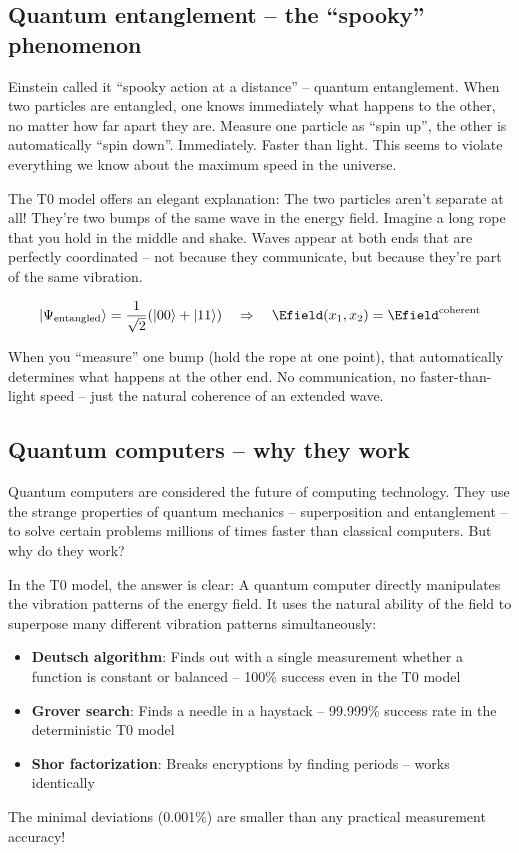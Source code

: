 	\subsection{Quantum entanglement -- the ``spooky'' phenomenon}
	
	Einstein called it ``spooky action at a distance'' -- quantum entanglement. When two particles are entangled, one knows immediately what happens to the other, no matter how far apart they are. Measure one particle as ``spin up'', the other is automatically ``spin down''. Immediately. Faster than light. This seems to violate everything we know about the maximum speed in the universe.
	
	The T0 model offers an elegant explanation: The two particles aren't separate at all! They're two bumps of the same wave in the energy field. Imagine a long rope that you hold in the middle and shake. Waves appear at both ends that are perfectly coordinated -- not because they communicate, but because they're part of the same vibration.
	
	\begin{equation}
		|\Psi_{\text{entangled}}\rangle = \frac{1}{\sqrt{2}}(|00\rangle + |11\rangle) \quad \Rightarrow \quad \Efield(x_1, x_2) = \Efield^{\text{coherent}}
	\end{equation}
	
	When you ``measure'' one bump (hold the rope at one point), that automatically determines what happens at the other end. No communication, no faster-than-light speed -- just the natural coherence of an extended wave.
	
	\subsection{Quantum computers -- why they work}
	
	Quantum computers are considered the future of computing technology. They use the strange properties of quantum mechanics -- superposition and entanglement -- to solve certain problems millions of times faster than classical computers. But why do they work?
	
	\begin{experimental}
		In the T0 model, the answer is clear: A quantum computer directly manipulates the vibration patterns of the energy field. It uses the natural ability of the field to superpose many different vibration patterns simultaneously:
		
		\begin{itemize}
			\item \textbf{Deutsch algorithm}: Finds out with a single measurement whether a function is constant or balanced -- 100\% success even in the T0 model
			\item \textbf{Grover search}: Finds a needle in a haystack -- 99.999\% success rate in the deterministic T0 model
			\item \textbf{Shor factorization}: Breaks encryptions by finding periods -- works identically
		\end{itemize}
		
		The minimal deviations (0.001\%) are smaller than any practical measurement accuracy!
	\end{experimental}
	
